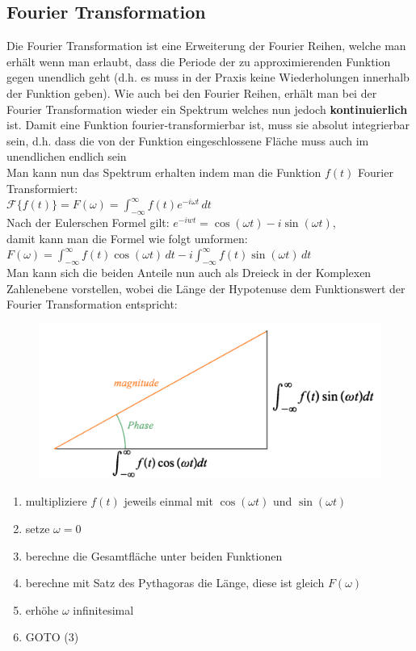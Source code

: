 \documentclass[12pt,a4paper]{article}
\newcommand{\nl}{\\[0.1cm]}
\begin{document}
\subsection{Fourier Transformation}
Die Fourier Transformation ist eine Erweiterung der Fourier Reihen, welche man erhält wenn man erlaubt, dass die Periode der zu approximierenden Funktion gegen unendlich geht (d.h. es muss in der Praxis keine Wiederholungen innerhalb der Funktion geben). Wie auch bei den Fourier Reihen, erhält man bei der Fourier Transformation wieder ein Spektrum welches nun jedoch \textbf{kontinuierlich} ist.
Damit eine Funktion fourier-transformierbar ist, muss sie absolut integrierbar sein, d.h. dass die von der Funktion eingeschlossene Fläche muss auch im unendlichen endlich sein\nl
Man kann nun das Spektrum erhalten indem man die Funktion $f(t)$ Fourier Transformiert:\nl
$\displaystyle \mathcal{F}\{f(t)\} = F(\omega) = \int_{-\infty}^\infty f(t)e^{-i\omega t}\,dt$\nl
Nach der Eulerschen Formel gilt: $e^{-iwt} = \cos(\omega t) - i\sin(\omega t)$,\\ damit kann man die Formel wie folgt umformen:\nl
$\displaystyle F(\omega) = \int_{-\infty}^\infty f(t) \cos(\omega t)\,dt -i\int_{-\infty}^\infty f(t) \sin(\omega t)\,dt$\nl
Man kann sich die beiden Anteile nun auch als Dreieck in der Komplexen Zahlenebene vorstellen, wobei die Länge der Hypotenuse dem Funktionswert der Fourier Transformation entspricht:\nl
\begin{figure}[H]
\centering
\includegraphics[scale=0.2]{./resources/ft_dreieck.png}
\end{figure}
\begin{enumerate}
\item multipliziere $f(t)$ jeweils einmal mit $\cos(\omega t)$ und $\sin(\omega t)$
\item setze $\omega = 0$
\item berechne die Gesamtfläche unter beiden Funktionen
\item berechne mit Satz des Pythagoras die Länge, diese ist gleich $F(\omega)$
\item erhöhe $\omega$ infinitesimal
\item GOTO (3)
\end{enumerate}
\end{document}
